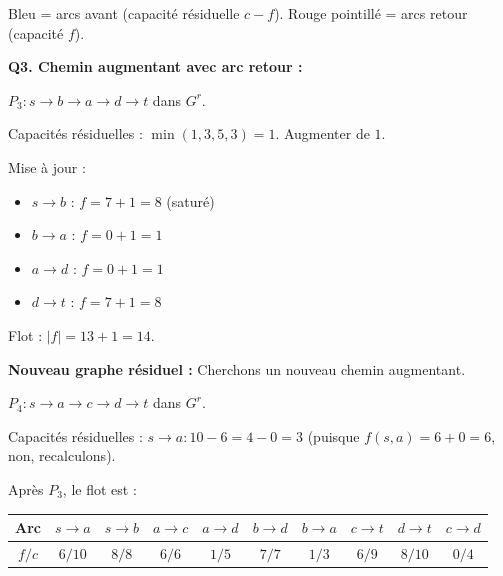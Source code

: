 \documentclass[12pt,a4paper]{article}
\begin{document}
\begin{correction}
\begin{center}
\end{center}

{\small Bleu = arcs avant (capacit\'e r\'esiduelle $c-f$). Rouge pointill\'e = arcs retour (capacit\'e $f$).}

\medskip
\textbf{Q3. Chemin augmentant avec arc retour :}

$P_3 : s \to b \to a \to d \to t$ dans $G^r$.

Capacit\'es r\'esiduelles : $\min(1, 3, 5, 3) = 1$. Augmenter de $1$.

Mise \`a jour :
\begin{itemize}[nosep]
    \item $s \to b$ : $f = 7+1 = 8$ (satur\'e)
    \item $b \to a$ : $f = 0+1 = 1$
    \item $a \to d$ : $f = 0+1 = 1$
    \item $d \to t$ : $f = 7+1 = 8$
\end{itemize}

Flot : $|f| = 13 + 1 = 14$.

\medskip
\textbf{Nouveau graphe r\'esiduel :} Cherchons un nouveau chemin augmentant.

$P_4 : s \to a \to c \to d \to t$ dans $G^r$.

Capacit\'es r\'esiduelles : $s \to a : 10-6 = 4 - 0 = 3$ (puisque $f(s,a)=6+0=6$, non, recalculons).

Apr\`es $P_3$, le flot est :

\begin{center}
\begin{tabular}{|c|c|c|c|c|c|c|c|c|c|}
\hline
Arc & $s\!\to\!a$ & $s\!\to\!b$ & $a\!\to\!c$ & $a\!\to\!d$ & $b\!\to\!d$ & $b\!\to\!a$ & $c\!\to\!t$ & $d\!\to\!t$ & $c\!\to\!d$ \\\hline
$f/c$ & $6/10$ & $8/8$ & $6/6$ & $1/5$ & $7/7$ & $1/3$ & $6/9$ & $8/10$ & $0/4$ \\\hline
\end{tabular}
\end{center}


\end{correction}
\end{document}
